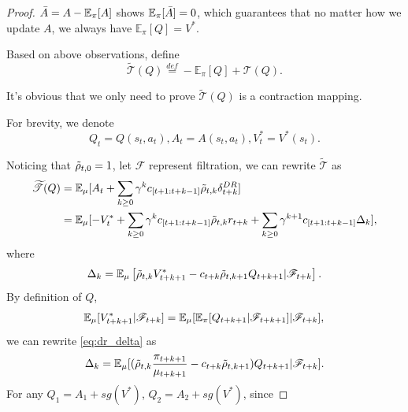 \begin{proof}

$\Bar{A} = A - \mathbb{E}_\pi[A]$ shows $\mathbb{E}_\pi[\Bar{A}] = 0$, which guarantees that no matter how we update $A$, we always have $\mathbb{E}_\pi[Q] = V^*$.

Based on above observations, define 
$$
    \widetilde{\mathscr{T}}(Q) \overset{def}{=} - \mathbb{E}_\pi [Q] + \mathscr{T}(Q).
$$

It's obvious that we only need to prove $\widetilde{\mathscr{T}}(Q)$ is a contraction mapping.

For brevity, we denote $$Q_t = Q(s_t, a_t), A_t = A(s_t, a_t), V^*_t = V^*(s_t).$$

Noticing that $\Tilde{\rho}_{t, 0} = 1$, let $\mathscr{F}$ represent filtration, we can rewrite $\widetilde{\mathscr{T}}$ as 
\begin{equation}
\label{eq:dr_a_2}
\begin{aligned}
    \widetilde{\mathscr{T}}(Q)
    &= \mathbb{E}_{\mu}   [
        A_t + \sum_{k \geq 0}  \gamma^k
        c_{[t+1:t+k-1]} \Tilde{\rho}_{t, k}
        \delta^{DR}_{t+k}
        ] \\
    &= \mathbb{E}_{\mu}   [
        -V^*_t + \sum_{k \geq 0}  \gamma^k
        c_{[t+1:t+k-1]} \Tilde{\rho}_{t, k}
        r_{t+k}
        + 
        \sum_{k \geq 0}  \gamma^{k+1}
        c_{[t+1:t+k-1]} \Delta_k ],
        \\
\end{aligned}
\end{equation}
where 
\begin{equation}
\label{eq:dr_delta}
    \Delta_k = \mathbb{E}_{\mu}\left[\Tilde{\rho}_{t, k} V^*_{t+k+1} - c_{t+k} \Tilde{\rho}_{t, k+1} Q_{t+k+1} | \mathscr{F}_{t+k}\right].
\end{equation}
By definition of $Q$,
$$
    \mathbb{E}_{\mu}[V_{t+k+1}^*|\mathscr{F}_{t+k}] 
    = \mathbb{E}_{\mu}[
    \mathbb{E}_\pi[Q_{t+k+1}|\mathscr{F}_{t+k+1}]
    |\mathscr{F}_{t+k}], \\
$$
we can rewrite \eqref{eq:dr_delta} as
\begin{equation}
\label{eq:dr_q_delta}
\Delta_k = \mathbb{E}_{\mu}[
(
\Tilde{\rho}_{t, k} \frac{\pi_{t+k+1}}{\mu_{t+k+1}}- c_{t+k} \Tilde{\rho}_{t, k+1} 
) Q_{t+k+1} | \mathscr{F}_{t+k}
].
\end{equation}
For any $Q_1 = A_1 + sg(V^*)$, $Q_2 = A_2 + sg(V^*)$, since

\end{proof}
